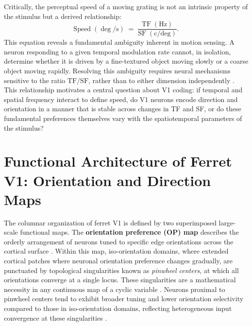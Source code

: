 \documentclass{brandeis-thesis3.3}
\begin{document}
Critically, the perceptual speed of a moving grating is not an
intrinsic property of the stimulus but a derived relationship:
%
\begin{equation}
  \text{Speed}\;(\deg/\text{s}) \;=\;
  \frac{\text{TF}\;(\text{Hz})}{\text{SF}\;(\text{c/deg})}.
  \label{eq:speed}
\end{equation}
%
This equation reveals a fundamental ambiguity inherent in motion
sensing. A neuron responding to a given temporal modulation rate cannot,
in isolation, determine whether it is driven by a fine-textured object
moving slowly or a coarse object moving rapidly. Resolving this
ambiguity requires neural mechanisms sensitive to the ratio
$\text{TF}/\text{SF}$, rather than to either dimension independently
\citep{Adelson1985}. This relationship motivates a central
question about V1 coding: if temporal and spatial frequency interact to
define speed, do V1 neurons encode direction and orientation in a manner
that is stable across changes in TF and SF, or do these fundamental
preferences themselves vary with the spatiotemporal parameters of the
stimulus?

\section{Functional Architecture of Ferret V1:
  Orientation and Direction Maps}

The columnar organization of ferret V1 is defined by two superimposed
large-scale functional maps. The \textbf{orientation preference (OP)
map} describes the orderly arrangement of neurons tuned to specific
edge orientations across the cortical surface \citep{Bonhoeffer1991}.
Within this map, iso-orientation domains, where extended cortical patches
where neuronal orientation preference changes gradually, are punctuated
by topological singularities known as \textit{pinwheel centers}, at
which all orientations converge at a single locus. These singularities
are a mathematical necessity in any continuous map of a cyclic variable
\citep{Ohki2006}. Neurons proximal to pinwheel centers tend to exhibit
broader tuning and lower orientation selectivity compared to those in
iso-orientation domains, reflecting heterogeneous input convergence at
these singularities \citep{Nauhaus2008}.
\end{document}
